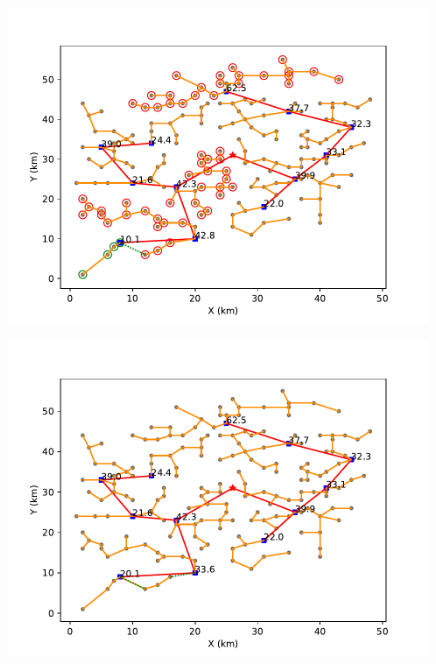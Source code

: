 \documentclass{cumcmthesis}
\begin{document}
  \begin{figure}[!h]
    \centering
    \begin{minipage}[c]{0.45\textwidth}
        \centering
        \includegraphics[width=0.99\textwidth]{figure/pipline_graft_connection_3.pdf}
        \label{fig:pipline_graft_connection_3}
    \end{minipage}
    \begin{minipage}[c]{0.45\textwidth}
        \centering
        \includegraphics[width=0.99\textwidth]{figure/pipline_graft_cut_3.pdf}
        \label{fig:pipline_graft_cut_3}
    \end{minipage}
  \end{figure}
  
\end{document}
